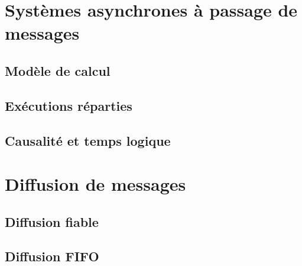 \documentclass[9pt]{beamer}
\begin{document}
\section{Systèmes asynchrones à passage de messages}
 
\subsection{Modèle de calcul}





 
\subsection{Exécutions réparties}



 
\subsection{Causalité et temps logique}





 
\section{Diffusion de messages}
 
\subsection{Diffusion fiable}




 
\subsection{Diffusion FIFO}



 
\end{document}
